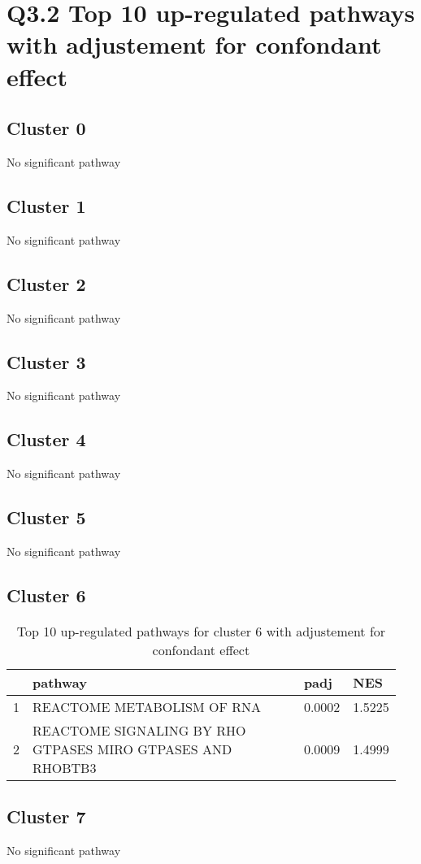 \documentclass{article}
\begin{document}
\section{Q3.2 Top 10 up-regulated pathways with adjustement for confondant effect}
\subsection{Cluster 0 }
No significant pathway
\subsection{Cluster 1 }
No significant pathway
\subsection{Cluster 2 }
No significant pathway
\subsection{Cluster 3 }
No significant pathway
\subsection{Cluster 4 }
No significant pathway
\subsection{Cluster 5 }
No significant pathway
\subsection{Cluster 6 }
\begin{table}[H]
\centering
\begin{tabular}{p{0.05\linewidth}p{0.7\linewidth}p{0.1\linewidth}p{0.1\linewidth}}
  \hline
 & pathway & padj & NES \\ 
  \hline
1 & REACTOME METABOLISM OF RNA & 0.0002 & 1.5225 \\ 
  2 & REACTOME SIGNALING BY RHO GTPASES MIRO GTPASES AND RHOBTB3 & 0.0009 & 1.4999 \\ 
   \hline
\end{tabular}
\caption{Top 10 up-regulated pathways for cluster 6 with adjustement for confondant effect} 
\label{tab:q3_2_conf_6}
\end{table}
\subsection{Cluster 7 }
No significant pathway
\end{document}
